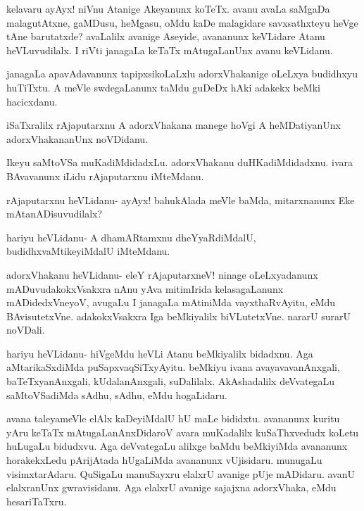 \documentclass{article}
\begin{document}
\begin{mng}%
kelavaru ayAyx! niVnu Atanige Akeyanunx koTeTx.
avanu avaLa saMgaDa malagutAtxne, gaMDusu, heMgasu, oMdu kaDe malagidare
savxsathxteyu heVge tAne barutatxde? avaLalilx avanige Aseyide, avananunx
keVLidare Atanu heVLuvudilalx. I riVti janagaLa keTaTx mAtugaLanUnx avanu
keVLidanu.
\end{mng}

\begin{mng}%
janagaLa apavAdavanunx tapipxsikoLaLxlu adorxVhakanige oLeLxya
budidhxyu huTiTxtu. A meVle swdegaLanunx taMdu guDeDx hAki adakekx beMki
hacicxdanu.
\end{mng}

\begin{mng}%
iSaTxralilx rAjaputarxnu A adorxVhakana manege hoVgi A
heMDatiyanUnx adorxVhakananUnx noVDidanu.
\end{mng}

\begin{mng}%
Ikeyu saMtoVSa muKadiMdidadxLu. adorxVhakanu duHKadiMdidadxnu.
ivara BAvavanunx iLidu rAjaputarxnu iMteMdanu.
\end{mng}

\begin{mng}%
rAjaputarxnu heVLidanu- ayAyx! bahukAlada meVle baMda,
mitarxnanunx Eke mAtanADisuvudilalx?
\end{mng}

\begin{mng}%
hariyu heVLidanu- A dhamARtamxnu dheYyaRdiMdalU, budidhxvaMtikeyiMdalU
iMteMdanu.
\end{mng}

\begin{mng}%
adorxVhakanu heVLidanu- eleY rAjaputarxneV! ninage oLeLxyadanunx
mADuvudakokxVsakxra nAnu yAva mitimIrida kelasagaLanunx mADidedxVneyoV,
avugaLu I janagaLa mAtiniMda vayxthaRvAyitu, eMdu BAvisutetxVne.
adakokxVsakxra Iga beMkiyalilx biVLutetxVne. nararU surarU noVDali. 
\end{mng}

\begin{mng}%
hariyu heVLidanu- hiVgeMdu heVLi Atanu beMkiyalilx
bidadxnu. Aga aMtarikaSxdiMda puSapxvaqSiTxyAyitu. beMkiyu ivana avayavavanAnxgali,
baTeTxyanAnxgali, kUdalanAnxgali, suDalilalx. AkAshadalilx deVvategaLu
saMtoVSadiMda sAdhu, sAdhu, eMdu hogaLidaru.
\end{mng}

\begin{mng}%
avana taleyameVle elAlx kaDeyiMdalU hU maLe
bididxtu. avananunx kuritu yAru keTaTx mAtugaLanAnxDidaroV avara muKadalilx
kuSaThxvedudx koLetu huLugaLu bidudxvu. Aga deVvategaLu alilxge baMdu
beMkiyiMda avananunx horakekxLedu pArijAtada hUgaLiMda avananunx vUjisidaru.
munugaLu visimxtarAdaru. QuSigaLu manuSayxru elalxrU avanige pUje
mADidaru. avanU elalxranUnx gwravisidanu. Aga elalxrU avanige sajajxna
adorxVhaka, eMdu hesariTaTxru.
\end{mng}
\end{document}
